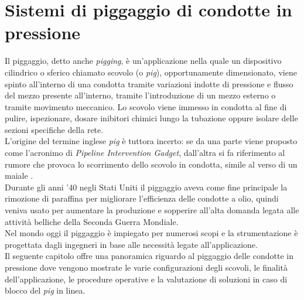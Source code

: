 \clearpage{\pagestyle{empty}\cleardoublepage}

\chapter{Sistemi di piggaggio di condotte in pressione}\thispagestyle{empty} 
Il piggaggio, detto anche \textit{pigging}, è un'applicazione nella quale un dispositivo cilindrico o sferico chiamato scovolo (o \textit{pig}), opportunamente dimensionato, viene spinto all'interno di una condotta tramite variazioni indotte di pressione e flusso del mezzo presente all'interno, tramite l'introduzione di un mezzo esterno o tramite movimento meccanico. Lo scovolo viene immesso in condotta al fine di pulire, ispezionare, dosare inibitori chimici lungo la tubazione oppure isolare delle sezioni specifiche della rete.\\
L'origine del termine inglese \textit{pig} è tuttora incerto: se da una parte viene proposto come l'acronimo di \textit{Pipeline Intervention Gadget}, dall'altra si fa riferimento al rumore che provoca lo scorrimento dello scovolo in condotta, simile al verso di un maiale \parencite{varghese2011intelligent}.\\
Durante gli anni '40 negli Stati Uniti il piggaggio aveva come fine principale la rimozione di paraffina per migliorare l'efficienza delle condotte a olio, quindi veniva usato per aumentare la produzione e sopperire all'alta domanda legata alle attività belliche della Seconda Guerra Mondiale.\\
Nel mondo oggi il piggaggio è impiegato per numerosi scopi e la strumentazione  è progettata dagli ingegneri in base alle necessità legate all'applicazione.\\
Il seguente capitolo offre una panoramica riguardo al piggaggio delle condotte in pressione dove vengono mostrate le varie configurazioni degli scovoli, le finalità dell'applicazione, le procedure operative e la valutazione di soluzioni in caso di blocco del \textit{pig} in linea.

